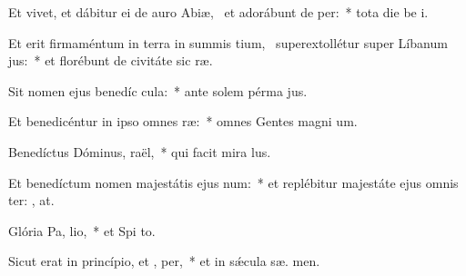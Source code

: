 \item Et vivet, et dábitur ei de auro Abiæ,~\pscross{} et adorábunt de  per:~* tota die be i.
\item Et erit firmaméntum in terra in summis tium,~\pscross{} superextollétur super Líbanum  jus:~* et florébunt de civitáte sic  ræ.
\item Sit nomen ejus benedíc  cula:~* ante solem pérma  jus.
\item Et benedicéntur in ipso omnes  ræ:~* omnes Gentes magni um.
\item Benedíctus Dóminus,  raël,~* qui facit mira lus.
\item Et benedíctum nomen majestátis ejus  num:~* et replébitur majestáte ejus omnis ter: , at.
\item Glória Pa,  lio,~* et Spi to.
\item Sicut erat in princípio, et ,  per,~* et in sǽcula sæ. men.
